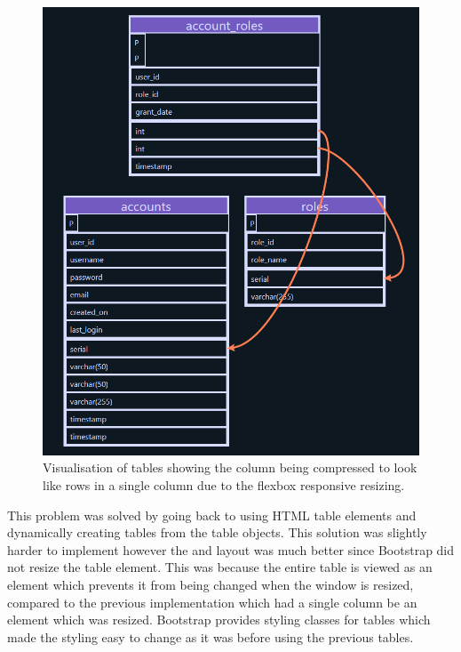 \begin{figure}[h!]
	\centering
	\includegraphics[scale=0.5]{postSquash}
	\caption{Visualisation of tables showing the column being compressed to look like rows in a single column due to the flexbox responsive resizing.}
	\label{fig:squash}
\end{figure}

This problem was solved by going back to using HTML table elements and dynamically creating tables from the table objects. This solution was slightly harder to implement however the and layout was much better since Bootstrap did not resize the table element. This was because the entire table is viewed as an element which prevents it from being changed when the window is resized, compared to the previous implementation which had a single column be an element which was resized. Bootstrap provides styling classes for tables which made the styling easy to change as it was before using the previous tables.

